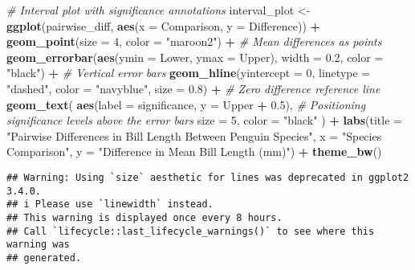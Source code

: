 \documentclass[
]{article}
\newenvironment{Shaded}{\begin{snugshade}}{\end{snugshade}}
\newcommand{\AttributeTok}[1]{\textcolor[rgb]{0.13,0.29,0.53}{#1}}
\newcommand{\CommentTok}[1]{\textcolor[rgb]{0.56,0.35,0.01}{\textit{#1}}}
\newcommand{\DecValTok}[1]{\textcolor[rgb]{0.00,0.00,0.81}{#1}}
\newcommand{\FloatTok}[1]{\textcolor[rgb]{0.00,0.00,0.81}{#1}}
\newcommand{\FunctionTok}[1]{\textcolor[rgb]{0.13,0.29,0.53}{\textbf{#1}}}
\newcommand{\NormalTok}[1]{#1}
\newcommand{\OtherTok}[1]{\textcolor[rgb]{0.56,0.35,0.01}{#1}}
\newcommand{\SpecialCharTok}[1]{\textcolor[rgb]{0.81,0.36,0.00}{\textbf{#1}}}
\newcommand{\StringTok}[1]{\textcolor[rgb]{0.31,0.60,0.02}{#1}}
\begin{document}
\begin{Shaded}
\begin{Highlighting}[]
\CommentTok{\# Interval plot with significance annotations}
\NormalTok{interval\_plot }\OtherTok{\textless{}{-}} \FunctionTok{ggplot}\NormalTok{(pairwise\_diff, }\FunctionTok{aes}\NormalTok{(}\AttributeTok{x =}\NormalTok{ Comparison, }\AttributeTok{y =}\NormalTok{ Difference)) }\SpecialCharTok{+}
  \FunctionTok{geom\_point}\NormalTok{(}\AttributeTok{size =} \DecValTok{4}\NormalTok{, }\AttributeTok{color =} \StringTok{"maroon2"}\NormalTok{) }\SpecialCharTok{+}  \CommentTok{\# Mean differences as points}
  \FunctionTok{geom\_errorbar}\NormalTok{(}\FunctionTok{aes}\NormalTok{(}\AttributeTok{ymin =}\NormalTok{ Lower, }\AttributeTok{ymax =}\NormalTok{ Upper), }\AttributeTok{width =} \FloatTok{0.2}\NormalTok{, }\AttributeTok{color =} \StringTok{"black"}\NormalTok{) }\SpecialCharTok{+} \CommentTok{\# Vertical error bars}
  \FunctionTok{geom\_hline}\NormalTok{(}\AttributeTok{yintercept =} \DecValTok{0}\NormalTok{, }\AttributeTok{linetype =} \StringTok{"dashed"}\NormalTok{, }\AttributeTok{color =} \StringTok{"navyblue"}\NormalTok{, }\AttributeTok{size =} \FloatTok{0.8}\NormalTok{) }\SpecialCharTok{+}  \CommentTok{\# Zero difference reference line}
  \FunctionTok{geom\_text}\NormalTok{(}
    \FunctionTok{aes}\NormalTok{(}\AttributeTok{label =}\NormalTok{ significance, }\AttributeTok{y =}\NormalTok{ Upper }\SpecialCharTok{+} \FloatTok{0.5}\NormalTok{),  }\CommentTok{\# Positioning significance levels above the error bars}
    \AttributeTok{size =} \DecValTok{5}\NormalTok{,}
    \AttributeTok{color =} \StringTok{"black"}
\NormalTok{  ) }\SpecialCharTok{+}
  \FunctionTok{labs}\NormalTok{(}\AttributeTok{title =} \StringTok{"Pairwise Differences in Bill Length Between Penguin Species"}\NormalTok{,}
    \AttributeTok{x =} \StringTok{"Species Comparison"}\NormalTok{,}
    \AttributeTok{y =} \StringTok{"Difference in Mean Bill Length (mm)"}\NormalTok{) }\SpecialCharTok{+}
  \FunctionTok{theme\_bw}\NormalTok{()}
\end{Highlighting}
\end{Shaded}

\begin{verbatim}
## Warning: Using `size` aesthetic for lines was deprecated in ggplot2 3.4.0.
## i Please use `linewidth` instead.
## This warning is displayed once every 8 hours.
## Call `lifecycle::last_lifecycle_warnings()` to see where this warning was
## generated.
\end{verbatim}
\end{document}
